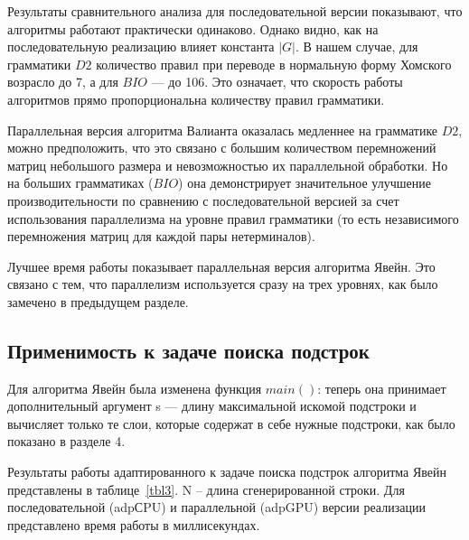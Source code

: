 \documentclass[14pt]{matmex-diploma-custom}
\begin{document}
Результаты сравнительного анализа для последовательной версии показывают, что алгоритмы работают практически одинаково. Однако видно, как на последовательную реализацию влияет константа $|G|$. В нашем случае, для грамматики $D2$ количество правил при переводе в нормальную форму Хомского возрасло до 7, а для $BIO$ --- до 106. Это означает, что скорость работы алгоритмов прямо пропорциональна количеству правил грамматики. 

Параллельная версия алгоритма Валианта оказалась медленнее на грамматике $D2$, можно предположить, что это связано с большим количеством перемножений матриц небольшого размера и невозможностью их параллельной обработки. Но на больших грамматиках ($BIO$) она демонстрирует значительное улучшение производительности по сравнению с последовательной версией за счет использования параллелизма на уровне правил грамматики (то есть независимого перемножения матриц для каждой пары нетерминалов).

Лучшее время работы показывает параллельная версия алгоритма Явейн. Это связано с тем, что параллелизм используется сразу на трех уровнях, как было замечено в предыдущем разделе. 

\subsection{Применимость к задаче поиска подстрок}

Для алгоритма Явейн была изменена функция $main()$: теперь она принимает дополнительный аргумент s --- длину максимальной искомой подстроки и вычисляет только те слои, которые содержат в себе нужные подстроки, как было показано в разделе 4.

Результаты работы адаптированного к задаче поиска подстрок алгоритма Явейн представлены в таблице~\ref{tbl3}. N – длина сгенерированной строки. Для последовательной (adpСPU) и параллельной (adpGPU) версии реализации представлено время работы в миллисекундах.
\end{document}
